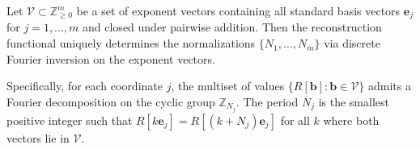 \begin{theorem}
\label{thm:reconstruction-uniqueness}
Let $\mathcal{V} \subset \mathbb{Z}^m_{\geq 0}$ be a set of exponent vectors containing all standard basis vectors $\mathbf{e}_j$ for $j = 1, \ldots, m$ and closed under pairwise addition. Then the reconstruction functional uniquely determines the normalizations $\{N_1, \ldots, N_m\}$ via discrete Fourier inversion on the exponent vectors.

Specifically, for each coordinate $j$, the multiset of values $\{R[\mathbf{b}] : \mathbf{b} \in \mathcal{V}\}$ admits a Fourier decomposition on the cyclic group $\mathbb{Z}_{N_j}$. The period $N_j$ is the smallest positive integer such that $R[k \mathbf{e}_j] = R[(k + N_j) \mathbf{e}_j]$ for all $k$ where both vectors lie in $\mathcal{V}$.
\end{theorem}


